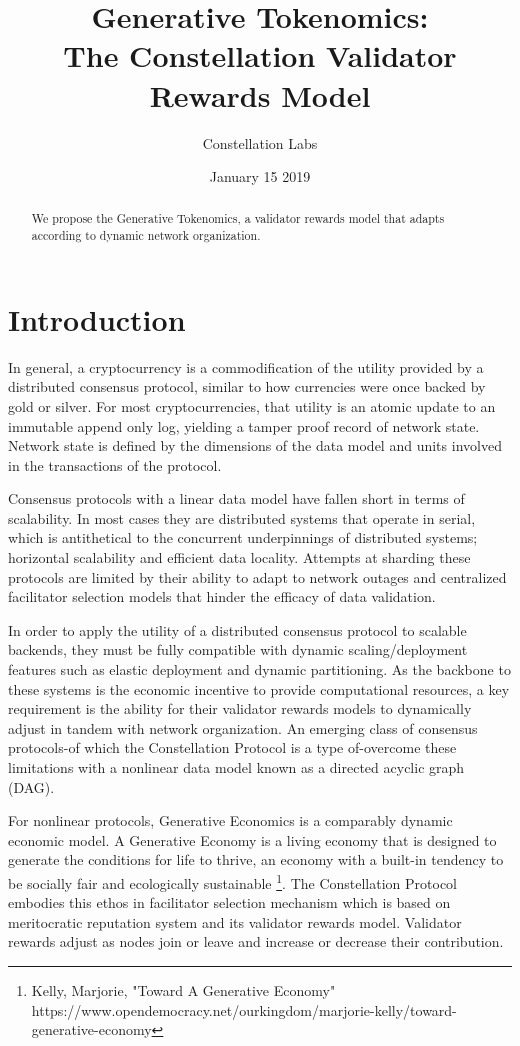 \documentclass{article}
\title{Generative Tokenomics:\\ The Constellation Validator Rewards Model}
\author{Constellation Labs}
\date{January 15 2019}
\begin{document}
\maketitle

\begin{abstract}
We propose the Generative Tokenomics, a validator rewards model that adapts according to dynamic network organization.
\end{abstract}
\setcounter{secnumdepth}{0}
\section{Introduction}
In general, a cryptocurrency is a commodification of the utility provided by a distributed consensus protocol, similar to how currencies were once backed by gold or silver. For most cryptocurrencies, that utility is an atomic update to an immutable append only log, yielding a tamper proof record of network state. Network state is defined by the dimensions of the data model and units involved in the transactions of the protocol. 

Consensus protocols with a linear data model have fallen short in terms of scalability. In most cases they are distributed systems that operate in serial, which is antithetical to the concurrent underpinnings of distributed systems; horizontal scalability and efficient data locality. Attempts at sharding these protocols are limited by their ability to adapt to network outages and centralized facilitator selection models that hinder the efficacy of data validation. 

In order to apply the utility of a distributed consensus protocol to scalable backends, they must be fully compatible with dynamic scaling/deployment features such as elastic deployment and dynamic partitioning. As the backbone to these systems is the economic incentive to provide computational resources, a key requirement is the ability for their validator rewards models to dynamically adjust in tandem with network organization. An emerging class of consensus protocols-of which the Constellation Protocol is a type of-overcome these limitations with a nonlinear data model known as a directed acyclic graph (DAG).

For nonlinear protocols, Generative Economics is a comparably dynamic economic model. A Generative Economy is a living economy that is designed to generate the conditions for life to thrive, an economy with a built-in tendency to be socially fair and ecologically sustainable \footnote{Kelly, Marjorie, "Toward A Generative Economy" https://www.opendemocracy.net/ourkingdom/marjorie-kelly/toward-generative-economy}. The Constellation Protocol embodies this ethos in facilitator selection mechanism which is based on meritocratic reputation system and its validator rewards model. Validator rewards adjust as nodes join or leave and increase or decrease their contribution.
\end{document}
